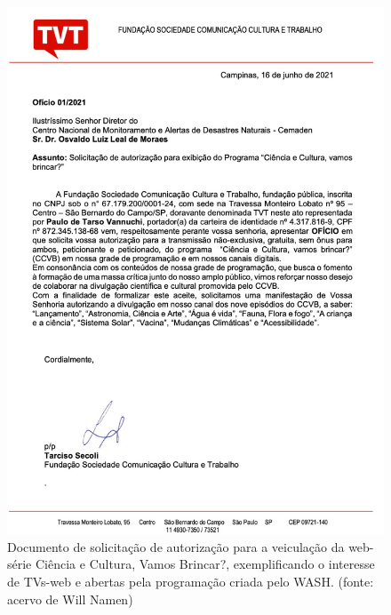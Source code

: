 \documentclass[
12pt,		%
openright,	%
twoside,  %
a4paper,			%
chapter=TITLE,		%
english,			%
french,				%
spanish,			%
brazil				%
]{USPSC-classe/USPSC}
\begin{document}
\begin{alineas}
\end{alineas}



\captionsetup{format=plain}
\begin{figure}[max size={\textwidth}{\textheight}]

\centering


\begin{minipage}[b]{0.4\linewidth}
        \centering
                \includegraphics[width=1.0\linewidth]{../../imagens/TVT.jpg}
                \caption{Documento de solicita\c{c}\~ao de autoriza\c{c}\~ao para a veicula\c{c}\~ao da web-s\'erie Ci\^encia e Cultura, Vamos Brincar?, exemplificando o interesse de TVs-web e abertas pela programa\c{c}\~ao criada pelo WASH. (fonte: acervo de Will Namen)}
                \label{51f9418c1ca6e2404e9d774513fb6c023d10b3bb}
\end{minipage}%
\hspace{0.5cm}
\end{figure}
\end{document}
